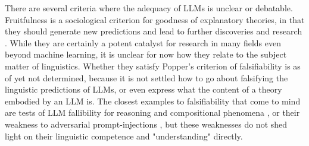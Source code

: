 \begin{fullwidth}
\begin{multicols}{2}
There are several criteria where the adequacy of LLMs is unclear or debatable. Fruitfulness is a sociological criterion for goodness of explanatory theories, in that they should generate new predictions and lead to further discoveries and research \citep{}. While they are certainly a potent catalyst for research in many fields even beyond machine learning, it is unclear for now how they relate to the subject matter of linguistics. Whether they satisfy Popper's criterion of falsifiability is as of yet not determined, because it is not settled how to go about falsifying the linguistic predictions of LLMs, or even express what the content of a theory embodied by an LLM is. The closest examples to falsifiability that come to mind are tests of LLM fallibility for reasoning and compositional phenomena \citep{}, or their weakness to adversarial prompt-injections \citep{}, but these weaknesses do not shed light on their linguistic competence and "understanding" directly.\\


\end{multicols}
\end{fullwidth}
